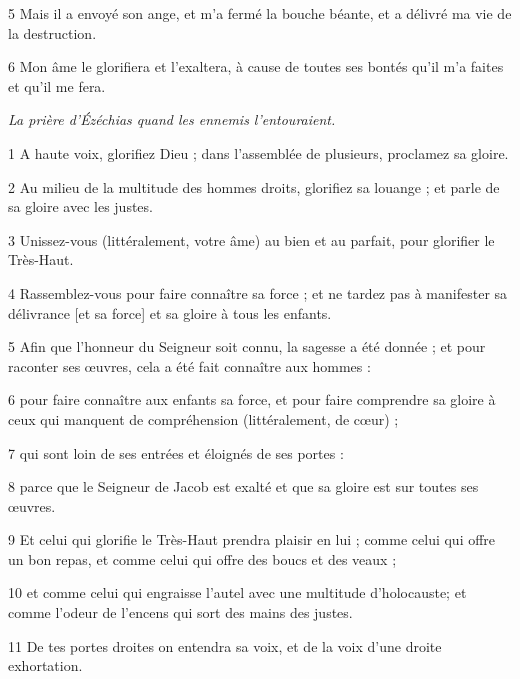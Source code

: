 \par 5 Mais il a envoyé son ange, et m'a fermé la bouche béante, et a délivré ma vie de la destruction.

\par 6 Mon âme le glorifiera et l'exaltera, à cause de toutes ses bontés qu'il m'a faites et qu'il me fera.


\par \textit{La prière d'Ézéchias quand les ennemis l'entouraient.}

\par 1 A haute voix, glorifiez Dieu ; dans l’assemblée de plusieurs, proclamez sa gloire.

\par 2 Au milieu de la multitude des hommes droits, glorifiez sa louange ; et parle de sa gloire avec les justes.

\par 3 Unissez-vous (littéralement, votre âme) au bien et au parfait, pour glorifier le Très-Haut.

\par 4 Rassemblez-vous pour faire connaître sa force ; et ne tardez pas à manifester sa délivrance [et sa force] et sa gloire à tous les enfants.

\par 5 Afin que l'honneur du Seigneur soit connu, la sagesse a été donnée ; et pour raconter ses œuvres, cela a été fait connaître aux hommes :

\par 6 pour faire connaître aux enfants sa force, et pour faire comprendre sa gloire à ceux qui manquent de compréhension (littéralement, de cœur) ;

\par 7 qui sont loin de ses entrées et éloignés de ses portes :

\par 8 parce que le Seigneur de Jacob est exalté et que sa gloire est sur toutes ses œuvres.

\par 9 Et celui qui glorifie le Très-Haut prendra plaisir en lui ; comme celui qui offre un bon repas, et comme celui qui offre des boucs et des veaux ;

\par 10 et comme celui qui engraisse l'autel avec une multitude d'holocauste; et comme l'odeur de l'encens qui sort des mains des justes.

\par 11 De tes portes droites on entendra sa voix, et de la voix d'une droite exhortation.


